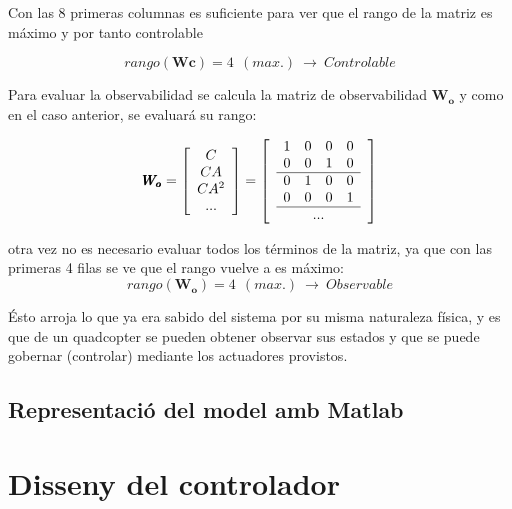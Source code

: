 \documentclass[twoside]{article}
\begin{document}
Con las 8 primeras columnas es suficiente para ver que el rango de la matriz es máximo y por tanto controlable

\begin{equation}
rango(\pmb{Wc})=4\>\>(max.)\> \rightarrow \>Controlable
\end{equation}

Para evaluar la observabilidad se calcula la matriz de observabilidad $\pmb{W_o}$ y como en el caso anterior, se evaluará su rango:

\begin{equation}
\pmb{W_o}=\left[ \begin{array}{c}
C \\
CA \\
CA^2 \\
...
\end{array}\right] =\left[\begin{array}{c}

\begin{array}{cccc}
1 & 0 & 0 & 0 \\
0 & 0 & 1 & 0 \\
\hline 
0 & 1 & 0 & 0 \\
0 & 0 & 0 & 1 \\
\hline
\end{array}\\
...\\ \end{array} \right]
\end{equation}

otra vez no es necesario evaluar todos los términos de la matriz, ya que con las primeras 4 filas se ve que el rango vuelve a es máximo:
\begin{equation}
rango(\pmb{W_o})=4\>\>(max.) \> \rightarrow \> Observable
\end{equation}

Ésto arroja lo que ya era sabido del sistema por su misma naturaleza física, y es que de un quadcopter se pueden obtener observar sus estados y que se puede gobernar (controlar) mediante los actuadores provistos. 

\newpage
\subsection{Representació del model amb Matlab}

\newpage
\section{Disseny del controlador} \label{control}
\newpage
\end{document}
